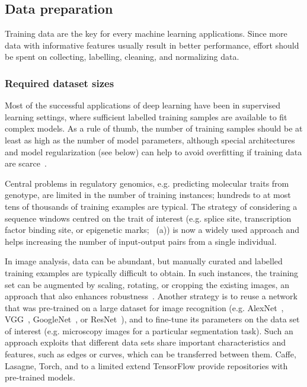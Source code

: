\subsection{Data preparation}

Training data are the key for every machine learning applications. Since more data with informative features usually result in better performance, effort should be spent on collecting, labelling, cleaning, and normalizing data.


\subsubsection{Required dataset sizes}

Most of the successful applications of deep learning have been in supervised learning settings, where sufficient labelled training samples are available to fit complex models. As a rule of thumb, the number of training samples should be at least as high as the number of model parameters, although special architectures and model regularization (see below) can help to avoid overfitting if training data are scarce~\citep{bengio_practical_2012}.

Central problems in regulatory genomics, e.g. predicting molecular traits from genotype, are limited in the number of training instances; hundreds to at most tens of thousands of training examples are typical. The strategy of considering a sequence windows centred on the trait of interest (e.g. splice site, transcription factor binding site, or epigenetic marks; ~(a)) is now a widely used approach and helps increasing the number of input-output pairs from a single individual.

In image analysis, data can be abundant, but manually curated and labelled training examples are typically difficult to obtain. In such instances, the training set can be augmented by scaling, rotating, or cropping the existing images, an approach that also enhances robustness~\citep{krizhevsky_imagenet_2012}. Another strategy is to reuse a network that was pre-trained on a large dataset for image recognition (e.g. AlexNet~\citep{krizhevsky_imagenet_2012}, VGG~\citep{simonyan_very_2014}, GoogleNet~\citep{szegedy_rethinking_2015}, or ResNet~\citep{he_deep_2015}), and to fine-tune its parameters on the data set of interest (e.g. microscopy images for a particular segmentation task). Such an approach exploits that different data sets share important characteristics and features, such as edges or curves, which can be transferred between them. Caffe, Lasagne, Torch, and to a limited extend TensorFlow provide repositories with pre-trained models.



